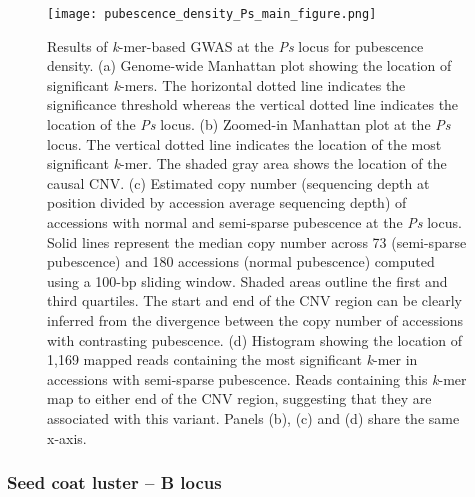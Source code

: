 \begin{figure}
	\centering
	\texttt{[image: pubescence\_density\_Ps\_main\_figure.png]}
	\caption[Results of \textit{k}-mer-based GWAS at the
	\textit{Ps} locus for pubescence density.]{Results of \textit{k}-mer-based GWAS at the
	\textit{Ps} locus for pubescence density.
	(a) Genome-wide Manhattan plot showing the location of significant \textit{k}-mers. The
	horizontal dotted line indicates the significance threshold whereas the
	vertical dotted line indicates the location of the \textit{Ps} locus.
	(b) Zoomed-in Manhattan plot at the \textit{Ps} locus. The
	vertical dotted line indicates the location of the most significant
	\textit{k}-mer. The shaded gray area shows the location of the causal CNV.
	(c) Estimated copy number (sequencing depth at position divided by
	accession average sequencing depth) of accessions with normal and
	semi-sparse pubescence at the \textit{Ps} locus. Solid lines represent
	the median copy number across 73 (semi-sparse pubescence) and 180
	accessions (normal pubescence) computed using a 100-bp sliding window.
	Shaded areas outline the first and third quartiles. The start and end
	of the CNV region can be clearly inferred from the divergence between
	the copy number of accessions with contrasting pubescence.
	(d) Histogram showing the location of 1,169 mapped reads containing the
	most significant \textit{k}-mer in accessions with semi-sparse pubescence.
	Reads containing this \textit{k}-mer map to either end of the CNV
	region, suggesting that they are associated with this variant. Panels
	(b), (c) and (d) share the same x-axis.}
	\label{pubescence-density-main-figure}
\end{figure}

\subsubsection*{Seed coat luster -- B locus}
\label{sv-gwas-main-results-seed-coat-luster-b}

